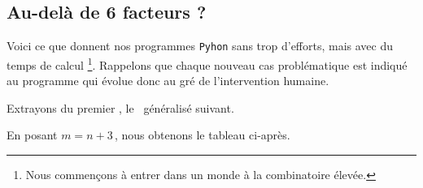 \subsection{Au-delà de 6 facteurs ?}

\leavevmode
\smallskip

Voici ce que donnent nos programmes \verb#Pyhon# sans trop d'efforts, mais avec du temps de calcul 
\footnote{
	Nous commençons à entrer dans un monde à la combinatoire élevée.
}.
Rappelons que chaque nouveau cas problématique est indiqué au programme qui évolue donc au gré de l'intervention humaine.








%
\begin{center}
\end{center}

Extrayons du premier \sftab[], le \sftab\ généralisé suivant.
%
\begin{center}
\end{center}

\newpage
En posant $m = n + 3$\,, nous obtenons le tableau ci-après.
%
\begin{center}
\end{center}


